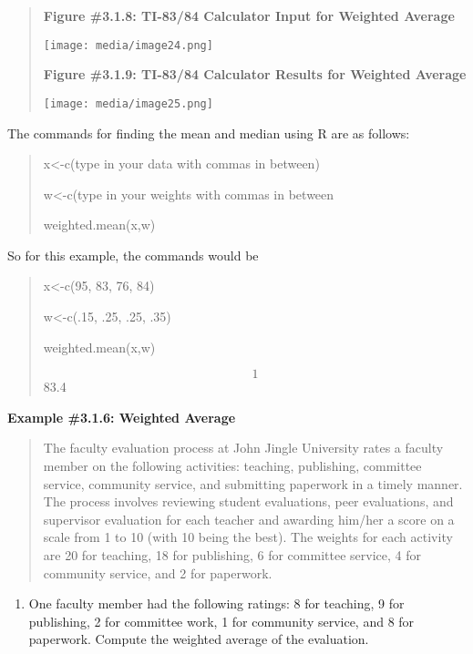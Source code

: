 \documentclass[]{book}
\providecommand{\tightlist}{%
  \setlength{\itemsep}{0pt}\setlength{\parskip}{0pt}}
\begin{document}
\begin{quote}
\textbf{Figure \#3.1.8: TI-83/84 Calculator Input for Weighted Average}

\texttt{[image: media/image24.png]}

\textbf{Figure \#3.1.9: TI-83/84 Calculator Results for Weighted Average}

\texttt{[image: media/image25.png]}
\end{quote}

The commands for finding the mean and median using R are as follows:

\begin{quote}
x\textless{}-c(type in your data with commas in between)

w\textless{}-c(type in your weights with commas in between

weighted.mean(x,w)
\end{quote}

So for this example, the commands would be

\begin{quote}
x\textless{}-c(95, 83, 76, 84)

w\textless{}-c(.15, .25, .25, .35)

weighted.mean(x,w)

\[1\] 83.4
\end{quote}

\textbf{Example \#3.1.6: Weighted Average}

\begin{quote}
The faculty evaluation process at John Jingle University rates a
faculty member on the following activities: teaching, publishing,
committee service, community service, and submitting paperwork in a
timely manner. The process involves reviewing student evaluations,
peer evaluations, and supervisor evaluation for each teacher and
awarding him/her a score on a scale from 1 to 10 (with 10 being the
best). The weights for each activity are 20 for teaching, 18 for
publishing, 6 for committee service, 4 for community service, and 2
for paperwork.
\end{quote}

\begin{enumerate}
\def\labelenumi{\alph{enumi})}
\tightlist
\item
  One faculty member had the following ratings: 8 for teaching, 9 for
  publishing, 2 for committee work, 1 for community service, and 8 for
  paperwork. Compute the weighted average of the evaluation.
\end{enumerate}
\end{document}
